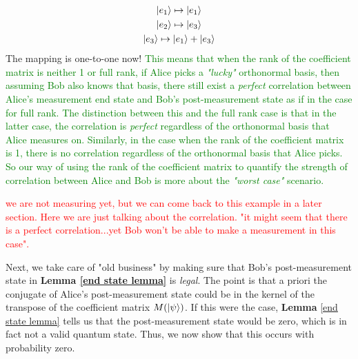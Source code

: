 \begin{gather}
    \ket{e_1} \mapsto \ket{e_1}\\
    \ket{e_2} \mapsto \ket{e_3}\\
    \ket{e_3} \mapsto \ket{e_1}+\ket{e_3}
\end{gather}
The mapping is one-to-one now! \textcolor{green}{This means that when the rank of the coefficient matrix is neither 1 or full rank, if Alice picks a \textit{"lucky"} orthonormal basis, then assuming Bob also knows that basis, there still exist a \textit{perfect} correlation between Alice's measurement end state and Bob's post-measurement state as if in the case for full rank. The distinction between this and the full rank case is that in the latter case, the correlation is \textit{perfect} regardless of the orthonormal basis that Alice measures on. Similarly, in the case when the rank of the coefficient matrix is 1, there is no correlation regardless of the orthonormal basis that Alice picks. So our way of using the rank of the coefficient matrix to quantify the strength of correlation between Alice and Bob is more about the \textit{"worst case"} scenario.}





\textcolor{red}{we are not measuring yet, but we can come back to this example in a later section. Here we are just talking about the correlation. "it might seem that there is a perfect correlation...yet Bob won't be able to make a measurement in this case".}






Next, we take care of "old business" by making sure that Bob's post-measurement state in \textbf{Lemma \ref{end state lemma}} is {\emph{legal}}.  The point is that a priori the conjugate of Alice's post-measurement state could be in the kernel of the transpose of the coefficient matrix $M(\ket{\psi})$. If this were the case, {\bf{Lemma}} \ref{end state lemma} tells us that the post-measurement state would be zero, which is in fact not a valid quantum state.  Thus, we now show that this occurs with probability zero.

